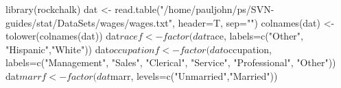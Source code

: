 \begin{Schunk}
\begin{Sinput}
 library(rockchalk)
 dat <- read.table("/home/pauljohn/ps/SVN-guides/stat/DataSets/wages/wages.txt", header=T, sep="") 
 colnames(dat) <- tolower(colnames(dat))
 dat$racef <- factor(dat$race, labels=c("Other", "Hispanic","White")) 
 dat$occupationf <- factor(dat$occupation, labels=c("Management", "Sales", "Clerical", "Service", "Professional", "Other")) 
 dat$marrf <- factor(dat$marr, levels=c("Unmarried","Married"))
\end{Sinput}
\end{Schunk}
